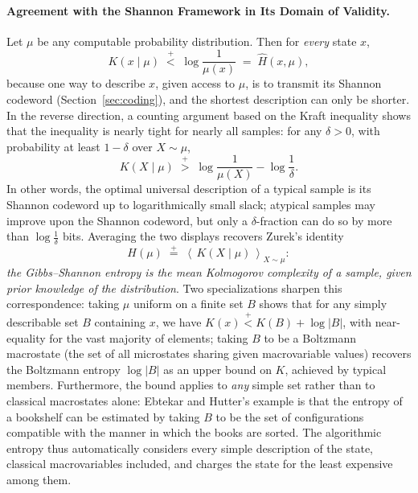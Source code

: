 \documentclass[10pt]{article}
\theoremstyle{definition}
\theoremstyle{remark}
\newcommand{\plt}{\mathrel{\stackrel{+}{<}}}
\newcommand{\pgt}{\mathrel{\stackrel{+}{>}}}
\newcommand{\peq}{\mathrel{\stackrel{+}{=}}}
\newcommand{\E}[1]{\left\langle #1 \right\rangle}
\begin{document}
\paragraph{Agreement with the Shannon Framework in Its Domain of Validity.} Let $\mu$ be any computable probability distribution. Then for \emph{every} state $x$,
\[
K(x \mid \mu) \;\plt\; \log \frac{1}{\mu(x)} \;=\; \hat H(x, \mu),
\]
because one way to describe $x$, given access to $\mu$, is to transmit its Shannon codeword (Section~\ref{sec:coding}), and the shortest description can only be shorter. In the reverse direction, a counting argument based on the Kraft inequality shows that the inequality is nearly tight for nearly all samples: for any $\delta > 0$, with probability at least $1 - \delta$ over $X \sim \mu$,
\[
K(X \mid \mu) \;\pgt\; \log\frac{1}{\mu(X)} - \log \frac1\delta .
\]
In other words, the optimal universal description of a typical sample is its Shannon codeword up to logarithmically small slack; atypical samples may improve upon the Shannon codeword, but only a $\delta$-fraction can do so by more than $\log\frac1\delta$ bits. Averaging the two displays recovers Zurek's identity
\[
H(\mu) \;\peq\; \E{\,K(X \mid \mu)\,}_{X \sim \mu} :
\]
\emph{the Gibbs--Shannon entropy is the mean Kolmogorov complexity of a sample, given prior knowledge of the distribution}. Two specializations sharpen this correspondence: taking $\mu$ uniform on a finite set $B$ shows that for any simply describable set $B$ containing $x$, we have $K(x) \plt K(B) + \log |B|$, with near-equality for the vast majority of elements; taking $B$ to be a Boltzmann macrostate (the set of all microstates sharing given macrovariable values) recovers the Boltzmann entropy $\log|B|$ as an upper bound on $K$, achieved by typical members. Furthermore, the bound applies to \emph{any} simple set rather than to classical macrostates alone: Ebtekar and Hutter's example is that the entropy of a bookshelf can be estimated by taking $B$ to be the set of configurations compatible with the manner in which the books are sorted. The algorithmic entropy thus automatically considers every simple description of the state, classical macrovariables included, and charges the state for the least expensive among them.
\end{document}
